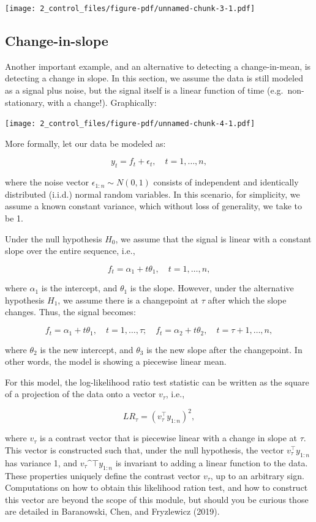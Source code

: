 \documentclass[
  letterpaper,
  DIV=11,
  numbers=noendperiod]{scrreprt}
\begin{document}
\texttt{[image: 2\_control\_files/figure-pdf/unnamed-chunk-3-1.pdf]}

\subsection{Change-in-slope}\label{change-in-slope}

Another important example, and an alternative to detecting a
change-in-mean, is detecting a change in slope. In this section, we
assume the data is still modeled as a signal plus noise, but the signal
itself is a linear function of time (e.g.~non-stationary, with a
change!). Graphically:

\texttt{[image: 2\_control\_files/figure-pdf/unnamed-chunk-4-1.pdf]}

More formally, let our data be modeled as:

\[
y_t = f_t + \epsilon_t, \quad t = 1, \dots, n,
\]

where the noise vector \(\epsilon_{1:n} \sim N(0, 1)\) consists of
independent and identically distributed (i.i.d.) normal random
variables. In this scenario, for simplicity, we assume a known constant
variance, which without loss of generality, we take to be 1.

Under the null hypothesis \(H_0\), we assume that the signal is linear
with a constant slope over the entire sequence, i.e.,

\[
f_t = \alpha_1 + t\theta_1, \quad t = 1, \dots, n,
\]

where \(\alpha_1\) is the intercept, and \(\theta_1\) is the slope.
However, under the alternative hypothesis \(H_1\), we assume there is a
changepoint at \(\tau\) after which the slope changes. Thus, the signal
becomes:

\[
f_t = \alpha_1 + t\theta_1, \quad t = 1, \dots, \tau; \quad f_t = \alpha_2 + t \theta_2, \quad t = \tau+1, \dots, n,
\]

where \(\theta_2\) is the new intercept, and \(\theta_3\) is the new
slope after the changepoint. In other words, the model is showing a
piecewise linear mean.

For this model, the log-likelihood ratio test statistic can be written
as the square of a projection of the data onto a vector \(v_\tau\),
i.e.,

\[
LR_\tau = \left( v_\tau^\top y_{1:n} \right)^2,
\]

where \(v_\tau\) is a contrast vector that is piecewise linear with a
change in slope at \(\tau\). This vector is constructed such that, under
the null hypothesis, the vector \(v_\tau^\top y_{1:n}\) has variance 1,
and \(v_\tau\^\top y_{1:n}\) is invariant to adding a linear function to
the data. These properties uniquely define the contrast vector
\(v_\tau\), up to an arbitrary sign. Computations on how to obtain this
likelihood ration test, and how to construct this vector are beyond the
scope of this module, but should you be curious those are detailed in
Baranowski, Chen, and Fryzlewicz (2019).
\end{document}
